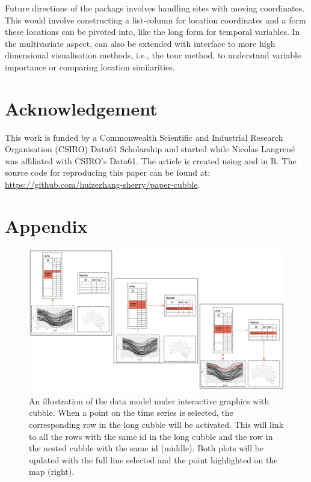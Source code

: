 \documentclass[
]{jss}
\begin{document}
Future directions of the package involves handling sites with moving coordinates. This would involve constructing a list-column for location coordinates and a form these locations can be pivoted into, like the long form for temporal variables. In the multivariate aspect,  can also be extended with interface to more high dimensional visualisation methods, i.e., the tour method, to understand variable importance or comparing location similarities.

\newpage

\hypertarget{acknowledgement}{%
\section{Acknowledgement}\label{acknowledgement}}

This work is funded by a Commonwealth Scientific and Industrial Research Organisation (CSIRO) Data61 Scholarship and started while Nicolas Langrené was affiliated with CSIRO's Data61. The article is created using  \citep{knitr} and  \citep{rmarkdown} in R. The source code for reproducing this paper can be found at: \url{https://github.com/huizezhang-sherry/paper-cubble}.

\hypertarget{appendix}{%
\section{Appendix}\label{appendix}}

\begin{CodeChunk}
\begin{figure}

{\centering \includegraphics[width=1\linewidth,height=0.4\textheight]{../figures/diagram-keynotes/diagram-keynotes.005} 

}

\caption[An illustration of the data model under interactive graphics with cubble]{An illustration of the data model under interactive graphics with cubble. When a point on the time series is selected, the corresponding row in the long cubble will be activated. This will link to all the rows with the same id in the long cubble and the row in the nested cubble with the same id (middle). Both plots will be updated with the full line selected and the point highlighted on the map (right).}\label{fig:illu-interactive-2}
\end{figure}
\end{CodeChunk}

\newpage


\end{document}

